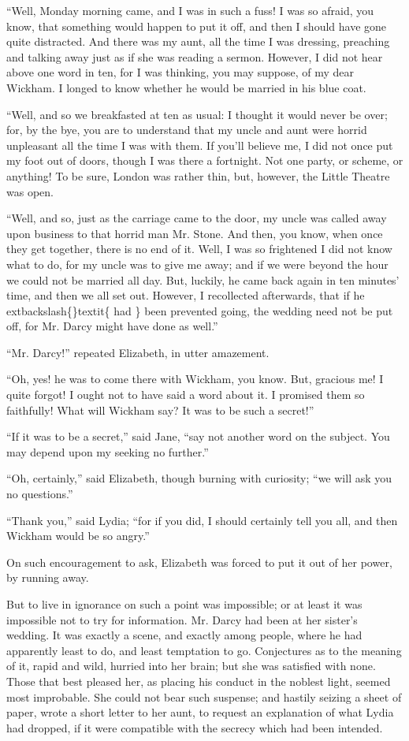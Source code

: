 \documentclass[10pt]{book}
\begin{document}
   “Well, Monday morning came, and I was in such a fuss! I was so afraid,
you know, that something would happen to put it off, and then I should
have gone quite distracted. And there was my aunt, all the time I was
dressing, preaching and talking away just as if she was reading a
sermon. However, I did not hear above one word in ten, for I was
thinking, you may suppose, of my dear Wickham. I longed to know whether
he would be married in his blue coat.
  

   “Well, and so we breakfasted at ten as usual: I thought it would never
be over; for, by the bye, you are to understand that my uncle and aunt
were horrid unpleasant all the time I was with them. If you’ll believe
me, I did not once put my foot out of doors, though I was there a
fortnight. Not one party, or scheme, or anything! To be sure, London was
rather thin, but, however, the Little Theatre was open.
  

   “Well, and so, just as the carriage came to the door, my uncle was
called away upon business to that horrid man Mr. Stone. And then, you
know, when once they get together, there is no end of it. Well, I was so
frightened I did not know what to do, for my uncle was to give me away;
and if we were beyond the hour we could not be married all day. But,
luckily, he came back again in ten minutes’ time, and then we all set
out. However, I recollected afterwards, that if he
   	extbackslash\{\}textit\{
    had
   \}
   been prevented
going, the wedding need not be put off, for Mr. Darcy might have done as
well.”
  

   “Mr. Darcy!” repeated Elizabeth, in utter amazement.
  

   “Oh, yes! he was to come there with Wickham, you know. But, gracious me!
I quite forgot! I ought not to have said a word about it. I promised
them so faithfully! What will Wickham say? It was to be such a secret!”
  

   “If it was to be a secret,” said Jane, “say not another word on the
subject. You may depend upon my seeking no further.”
  

   “Oh, certainly,” said Elizabeth, though burning with curiosity; “we will
ask you no questions.”
  

   “Thank you,” said Lydia; “for if you did, I should certainly tell you
all, and then Wickham would be so angry.”
  

   On such encouragement to ask, Elizabeth was forced to put it out of her
power, by running away.
  

   But to live in ignorance on such a point was impossible; or at least it
was impossible not to try for information. Mr. Darcy had been at her
sister’s wedding. It was exactly a scene, and exactly among people,
where he had apparently least to do, and least temptation to go.
Conjectures as to the meaning of it, rapid and wild,
   hurried into her
brain; but she was satisfied with none. Those that best pleased her, as
placing his conduct in the noblest light, seemed most improbable. She
could not bear such suspense; and hastily seizing a sheet of paper,
wrote a short letter to her aunt, to request an explanation of what
Lydia had dropped, if it were compatible with the secrecy which had been
intended.
  
\end{document}
